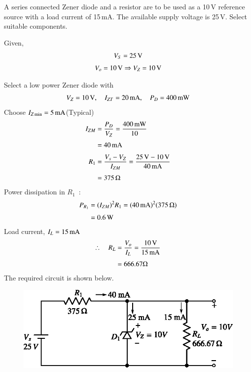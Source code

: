 \begin{example}\label{exam2.29}
A series connected Zener diode and a resistor are to be used as a 10\,V reference source with a load current of 15\,mA. The available supply voltage is 25\,V. Select suitable components.
\end{example}

\begin{solution}
Given,
\begin{gather*}
V_{S} = 25\,\text{V}\\[3pt]
V_{o}=10\text{\,V}\Rightarrow V_{Z}=10\text{\,V}
\end{gather*}

Select a low power Zener diode with
$$
V_{Z}=10\text{\,V},\quad I_{ZT}=20\text{\,mA},\quad P_{D}=400\text{\,mW}
$$
Choose $I_{Z\min}=5\text{\,mA}$\quad (Typical)
\begin{align*}
I_{ZM} &= \frac{P_{D}}{V_{Z}}=\frac{400\text{\,mW}}{10}\\[3pt]
&= 40\text{\,mA}\\[3pt]
R_{1} &= \frac{V_{s}-V_{Z}}{I_{ZM}}=\frac{25\text{\,V}-10\text{\,V}}{40\text{\,mA}}\\[3pt]
&= 375\,\Omega
\end{align*}
Power dissipation in $R_{1}$~:
\begin{align*}
P_{R_{1}} &= (I_{ZM})^{2}R_{1}=(40\text{\,mA})^{2}(375\,\Omega)\\[3pt]
&= 0.6\text{\,W}
\end{align*}
Load current, $I_{L}=15\text{\,mA}$
\begin{align*}
\therefore\quad R_{L} &= \frac{V_{o}}{I_{L}}=\frac{10\text{\,V}}{15\text{\,mA}}\\[3pt]
&= 666.67\Omega
\end{align*}
The required circuit is shown below.
\begin{figure}[H]
\centering
\includegraphics{chap2/sol2.27a.eps}
\end{figure}
\vskip -1cm
\end{solution}


